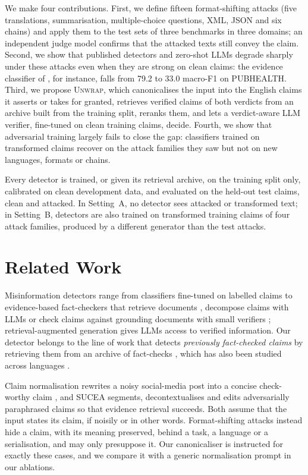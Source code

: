 \documentclass[11pt]{article}
\newcommand{\method}{\textsc{Unwrap}}
\begin{document}
We make four contributions. First, we define fifteen format-shifting attacks (five translations, summarisation, multiple-choice questions, XML, JSON and six chains) and apply them to the test sets of three benchmarks in three domains; an independent judge model confirms that the attacked texts still convey the claim. Second, we show that published detectors and zero-shot LLMs degrade sharply under these attacks even when they are strong on clean claims: the evidence classifier of \citet{kotonya2020pubhealth}, for instance, falls from 79.2 to 33.0 macro-F1 on PUBHEALTH. Third, we propose \method{}, which canonicalises the input into the English claims it asserts or takes for granted, retrieves verified claims of both verdicts from an archive built from the training split, reranks them, and lets a verdict-aware LLM verifier, fine-tuned on clean training claims, decide. Fourth, we show that adversarial training largely fails to close the gap: classifiers trained on transformed claims recover on the attack families they saw but not on new languages, formats or chains.

Every detector is trained, or given its retrieval archive, on the training split only, calibrated on clean development data, and evaluated on the held-out test claims, clean and attacked. In Setting~A, no detector sees attacked or transformed text; in Setting~B, detectors are also trained on transformed training claims of four attack families, produced by a different generator than the test attacks.

\section{Related Work}

Misinformation detectors range from classifiers fine-tuned on labelled claims \citep{kotonya2020pubhealth,guo2022survey} to evidence-based fact-checkers that retrieve documents \citep{thorne2018fever}, decompose claims with LLMs \citep{pan2023programfc} or check claims against grounding documents with small verifiers \citep{tang2024minicheck}; retrieval-augmented generation \citep{lewis2020rag} gives LLMs access to verified information. Our detector belongs to the line of work that detects \emph{previously fact-checked claims} by retrieving them from an archive of fact-checks \citep{shaar2020knownlie}, which has also been studied across languages \citep{pikuliak2023multiclaim}.

Claim normalisation rewrites a noisy social-media post into a concise check-worthy claim \citep{sundriyal2023claimnorm}, and SUCEA \citep{liu2025sucea} segments, decontextualises and edits adversarially paraphrased claims so that evidence retrieval succeeds. Both assume that the input states its claim, if noisily or in other words. Format-shifting attacks instead hide a claim, with its meaning preserved, behind a task, a language or a serialisation, and may only presuppose it. Our canonicaliser is instructed for exactly these cases, and we compare it with a generic normalisation prompt in our ablations.
\end{document}
